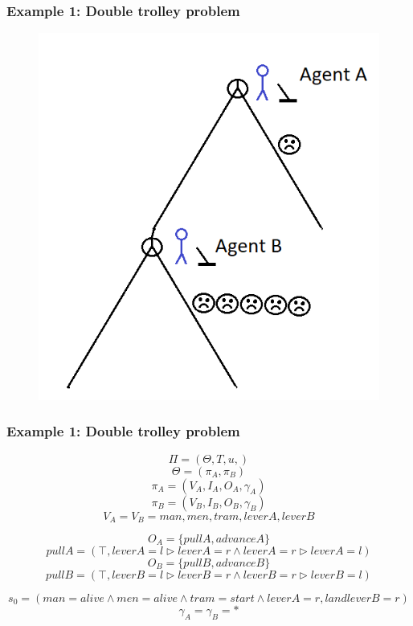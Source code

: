 \documentclass{beamer}
\begin{document}
\begin{frame}
\frametitle{Example 1: Double trolley problem}

\begin{figure}
\includegraphics[scale=1]{extended1}
\end{figure}
\end{frame}


\begin{frame}
\frametitle{Example 1: Double trolley problem}
\[
\Pi = \left( \Theta, T, u, \right)
\]
\[
\Theta=(\pi_A, \pi_B)
\]
\[
\pi_A = (V_A, I_A, O_A, \gamma_A)
\]
\[
\pi_B = (V_B, I_B, O_B, \gamma_B)
\]
\[
V_A = V_B = {man, men, tram, leverA, leverB}
\]

\[
O_A = \{pullA, advanceA\}
\]
\[
pullA = (\top, leverA=l \triangleright leverA=r \land leverA=r \triangleright leverA=l)
\]
\[
O_B = \{pullB, advanceB\}
\]
\[
pullB = (\top, leverB=l \triangleright leverB=r \land leverB=r \triangleright leverB=l)
\]

\[
s_0 = (man=alive \land men=alive \land tram = start \land leverA = r, land leverB = r)
\]
\[
\gamma_A=\gamma_B = *
\]
\end{frame}
\end{document}
